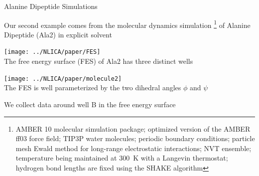 \documentclass[12pt]{beamer}
\begin{document}
\begin{frame}{Alanine Dipeptide Simulations}

    Our second example comes from the molecular dynamics simulation \footnote{
    AMBER 10 molecular simulation package;
    optimized version of the AMBER ff03 force field;
    TIP3P water molecules;
    periodic boundary conditions;
    particle mesh Ewald method for long-range electrostatic interactions;
    NVT ensemble;
    temperature being maintained at 300~K with a Langevin thermostat;
    hydrogen bond lengths are fixed using the SHAKE algorithm}
    of Alanine Dipeptide (Ala2) in explicit solvent

    \begin{minipage}[t]{0.5\textwidth}
        \centering
        \texttt{[image: ../NLICA/paper/FES]}\\
        {\small The free energy surface (FES) of Ala2 has three distinct wells}
    \end{minipage}
    \hfill
    \begin{minipage}[t]{0.4\textwidth}
        \centering
        \texttt{[image: ../NLICA/paper/molecule2]}\\
        {\small The FES is well parameterized by the two dihedral angles $\phi$ and $\psi$}
    \end{minipage}

    \vspace{0.1in}
    We collect data around well B in the free energy surface

\end{frame}
\end{document}
